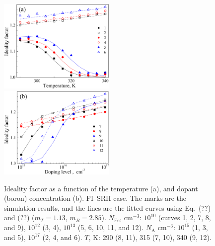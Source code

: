 \documentclass [sort&compress] {elsarticle}
\begin{document}
\begin{figure}
\includegraphics[width=0.5\textwidth]{FigS4a}%
\includegraphics[width=0.5\textwidth]{FigS4b}
\caption{\label{figS4}
Ideality factor as a function of the temperature (a), and dopant (boron) concentration (b).
FI--SRH case.
The marks are the simulation results, and the lines are the fitted curves using Eq.~(??) and (??) ($m_T = 1.13$, $m_B = 2.85$).
$N_\mathrm{Fe}$, cm$^{-3}$: $10^{10}$ (curves 1, 2, 7, 8, and 9), $10^{12}$ (3, 4), $10^{13}$ (5, 6, 10, 11, and 12).
$N_\mathrm{A}$ cm$^{-3}$: $10^{15}$ (1, 3, and 5), $10^{17}$ (2, 4, and 6).
$T$, K: 290 (8, 11), 315 (7, 10), 340 (9, 12).
}%
\end{figure}
\end{document}
